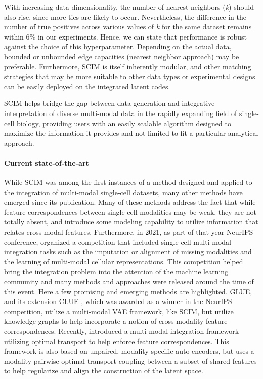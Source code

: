 With increasing data dimensionality, the number of nearest neighbors (\textit{k}) should also rise, since more ties are likely to occur.
Nevertheless, the difference in the number of true positives across various values of \textit{k} for the same dataset remains within 6\% in our experiments.
Hence, we can state that performance is robust against the choice of this hyperparameter.
Depending on the actual data, bounded or unbounded edge capacities (nearest neighbor approach) may be preferable.
Furthermore, SCIM is itself inherently modular, and other matching strategies that may be more suitable to other data types or experimental designs can be easily deployed on the integrated latent codes.

SCIM helps bridge the gap between data generation and integrative interpretation of diverse multi-modal data in the rapidly expanding field of single-cell biology, providing users with an easily scalable algorithm designed to maximize the information it provides and not limited to fit a particular analytical approach.

\paragraph{Current state-of-the-art}
While SCIM was among the first instances of a method designed and applied to the integration of multi-modal single-cell datasets, many other methods have emerged since its publication.
Many of these methods address the fact that while feature correspondences between single-cell modalities may be weak,  they are not totally absent, and introduce some modeling capability to utilize information that relates cross-modal features. 
Furthermore, in 2021, as part of that year NeurIPS conference, \citeauthor{lance2022} organized a competition that included single-cell multi-modal integration tasks such as the imputation or alignment of missing modalities and the learning of multi-modal cellular representations.
This competition helped bring the integration problem into the attention of the machine learning community and many methods and approaches were released around the time of this event.
Here a few promising and emerging methods are highlighted.
GLUE, and its extension CLUE \cite{tu2022}, which was awarded as a winner in the NeurIPS competition,
utilize a multi-modal VAE framework, like SCIM, but utilize knowledge graphs to help incorporate a notion of cross-modality feature correspondences.
Recently, \citeauthor{samaran2024} introduced a multi-modal integration framework utilizing optimal transport to help enforce feature correspondences.
This framework is also based on unpaired, modality specific auto-encoders, but uses a modality pairwise optimal transport coupling between a subset of shared features to help regularize and align the construction of the latent space.

